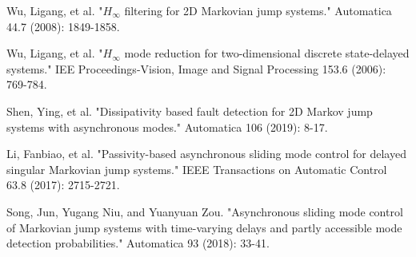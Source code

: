 \documentclass[conference]{IEEEtran}
\begin{document}
\begin{thebibliography}{1}
	Wu, Ligang, et al. "$H_{\infty}$ filtering for 2D Markovian jump systems." Automatica 44.7 (2008): 1849-1858.
	
	Wu, Ligang, et al. "$H_{\infty}$ mode reduction for two-dimensional discrete state-delayed systems." IEE Proceedings-Vision, Image and Signal Processing 153.6 (2006): 769-784.
	
	
	Shen, Ying, et al. "Dissipativity based fault detection for 2D Markov jump systems with asynchronous modes." Automatica 106 (2019): 8-17.
	
	
	Li, Fanbiao, et al. "Passivity-based asynchronous sliding mode control for delayed singular Markovian jump systems." IEEE Transactions on Automatic Control 63.8 (2017): 2715-2721.
	
	Song, Jun, Yugang Niu, and Yuanyuan Zou. "Asynchronous sliding mode control of Markovian jump systems with time-varying delays and partly accessible mode detection probabilities." Automatica 93 (2018): 33-41.
	
	
	
	
	
	
\end{thebibliography}




\end{document}
